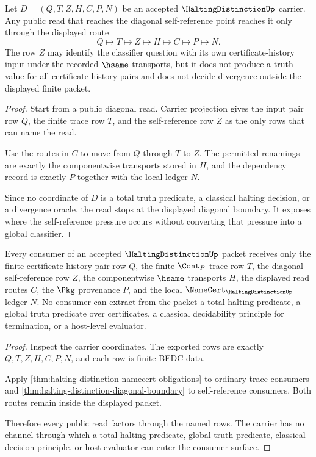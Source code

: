 \begin{theorem}
\label{thm:halting-distinction-diagonal-boundary}
Let $D=(Q,T,Z,H,C,P,N)$ be an accepted $\HaltingDistinctionUp$ carrier. Any public read that reaches the diagonal self-reference point reaches it only through the displayed route
$$
Q \longmapsto T \longmapsto Z \longmapsto H \longmapsto C \longmapsto P \longmapsto N.
$$
The row $Z$ may identify the classifier question with its own certificate-history input under the recorded $\hsame$ transports, but it does not produce a truth value for all certificate-history pairs and does not decide divergence outside the displayed finite packet.
\end{theorem}
\begin{proof}
Start from a public diagonal read. Carrier projection gives the input pair row $Q$, the finite trace row $T$, and the self-reference row $Z$ as the only rows that can name the read.

Use the routes in $C$ to move from $Q$ through $T$ to $Z$. The permitted renamings are exactly the componentwise transports stored in $H$, and the dependency record is exactly $P$ together with the local ledger $N$.

Since no coordinate of $D$ is a total truth predicate, a classical halting decision, or a divergence oracle, the read stops at the displayed diagonal boundary. It exposes where the self-reference pressure occurs without converting that pressure into a global classifier.
\end{proof}

\begin{theorem}
\label{thm:halting-distinction-consumer-non-escape}
Every consumer of an accepted $\HaltingDistinctionUp$ packet receives only the finite certificate-history pair row $Q$, the finite $\Cont_P$ trace row $T$, the diagonal self-reference row $Z$, the componentwise $\hsame$ transports $H$, the displayed read routes $C$, the $\Pkg$ provenance $P$, and the local $\NameCert_{\HaltingDistinctionUp}$ ledger $N$. No consumer can extract from the packet a total halting predicate, a global truth predicate over certificates, a classical decidability principle for termination, or a host-level evaluator.
\end{theorem}
\begin{proof}
Inspect the carrier coordinates. The exported rows are exactly $Q,T,Z,H,C,P,N$, and each row is finite BEDC data.

Apply \autoref{thm:halting-distinction-namecert-obligations} to ordinary trace consumers and \autoref{thm:halting-distinction-diagonal-boundary} to self-reference consumers. Both routes remain inside the displayed packet.

Therefore every public read factors through the named rows. The carrier has no channel through which a total halting predicate, global truth predicate, classical decision principle, or host evaluator can enter the consumer surface.
\end{proof}

